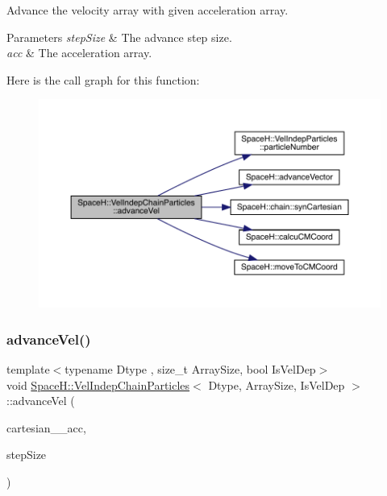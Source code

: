 Advance the velocity array with given acceleration array. 


\begin{DoxyParams}{Parameters}
{\em step\+Size} & The advance step size. \\
\hline
{\em acc} & The acceleration array. \\
\hline
\end{DoxyParams}
Here is the call graph for this function\+:
\nopagebreak
\begin{figure}[H]
\begin{center}
\leavevmode
\includegraphics[width=350pt]{class_space_h_1_1_vel_indep_chain_particles_a628718ae8e943e403adc9864be81d306_cgraph}
\end{center}
\end{figure}
\mbox{\label{class_space_h_1_1_vel_indep_chain_particles_ae5253fbb69161c625f878de540618eb7}} 
\subsubsection{\texorpdfstring{advance\+Vel()}{advanceVel()}\hspace{0.1cm}{\footnotesize\ttfamily [2/2]}}
{\footnotesize\ttfamily template$<$typename Dtype , size\+\_\+t Array\+Size, bool Is\+Vel\+Dep$>$ \\
void \mbox{\hyperlink{class_space_h_1_1_vel_indep_chain_particles}{Space\+H\+::\+Vel\+Indep\+Chain\+Particles}}$<$ Dtype, Array\+Size, Is\+Vel\+Dep $>$\+::advance\+Vel (\begin{DoxyParamCaption}\item[{const \mbox{\hyperlink{class_space_h_1_1_vel_indep_particles_aa9983058940249df8b00fa800e8cbad2}{Vector\+Array}} \&}]{cartesian_\+\_\+acc,  }\item[{\mbox{\hyperlink{class_space_h_1_1_vel_indep_particles_aeb47d8131b30ed790320ff634f0d6af1}{Scalar}}}]{step\+Size }\end{DoxyParamCaption})\hspace{0.3cm}{\ttfamily [inline]}}



